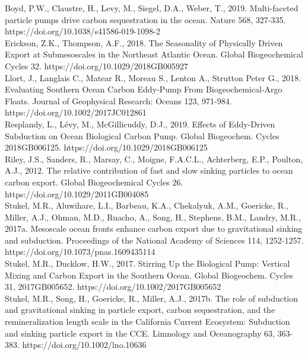 \documentclass[12pt,letter]{article}
\begin{document}
Boyd, P.W., Claustre, H., Levy, M., Siegel, D.A., Weber, T., 2019. Multi-faceted particle pumps drive carbon sequestration in the ocean. Nature 568, 327-335. https://doi.org/10.1038/s41586-019-1098-2\\

Erickson, Z.K., Thompson, A.F., 2018. The Seasonality of Physically Driven Export at Submesoscales in the Northeast Atlantic Ocean. Global Biogeochemical Cycles 32. https://doi.org/10.1029/2018GB005927\\

Llort, J., Langlais C., Matear R., Moreau S., Lenton A., Strutton Peter G., 2018. Evaluating Southern Ocean Carbon Eddy‐Pump From Biogeochemical‐Argo Floats. Journal of Geophysical Research: Oceans 123, 971-984. https://doi.org/10.1002/2017JC012861\\

Resplandy, L., Lévy, M., McGillicuddy, D.J., 2019. Effects of Eddy‐Driven Subduction on Ocean Biological Carbon Pump. Global Biogeochem. Cycles 2018GB006125. https://doi.org/10.1029/2018GB006125\\

Riley, J.S., Sanders, R., Marsay, C., Moigne, F.A.C.L., Achterberg, E.P., Poulton, A.J., 2012. The relative contribution of fast and slow sinking particles to ocean carbon export. Global Biogeochemical Cycles 26. https://doi.org/10.1029/2011GB004085\\

Stukel, M.R., Aluwihare, L.I., Barbeau, K.A., Chekalyuk, A.M., Goericke, R., Miller, A.J., Ohman, M.D., Ruacho, A., Song, H., Stephens, B.M., Landry, M.R., 2017a. Mesoscale ocean fronts enhance carbon export due to gravitational sinking and subduction. Proceedings of the National Academy of Sciences 114, 1252-1257. https://doi.org/10.1073/pnas.1609435114\\

Stukel, M.R., Ducklow, H.W., 2017. Stirring Up the Biological Pump: Vertical Mixing and Carbon Export in the Southern Ocean. Global Biogeochem. Cycles 31, 2017GB005652. https://doi.org/10.1002/2017GB005652\\

Stukel, M.R., Song, H., Goericke, R., Miller, A.J., 2017b. The role of subduction and gravitational sinking in particle export, carbon sequestration, and the remineralization length scale in the California Current Ecosystem: Subduction and sinking particle export in the CCE. Limnology and Oceanography 63, 363-383. https://doi.org/10.1002/lno.10636\\
\end{document}

